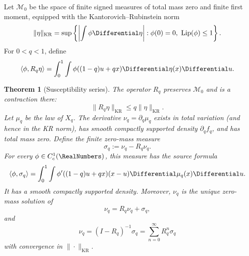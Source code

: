 \documentclass[11pt,oneside]{article}
\newtheorem{theorem}{Theorem}[section]
\theoremstyle{definition}
\theoremstyle{remark}
\newcommand{\Lip}{\operatorname{Lip}}
\begin{document}
Let \(\mathcal M_0\) be the space of finite signed measures of total mass zero and finite first
moment, equipped with the Kantorovich--Rubinstein norm
\begin{equation}
 \|\eta\|_{\mathrm{KR}}
 =\sup\left\{\left|\int\phi\Differential\eta\right|:
 \phi(0)=0,\ \Lip(\phi)\le1\right\}.
 \label{eq:KR}
\end{equation}
For \(0<q<1\), define
\begin{equation}
 \langle\phi,R_q\eta\rangle
 =\int_0^1\int\phi((1-q)u+qx)\Differential\eta(x)\Differential u.
 \label{eq:Rq}
\end{equation}

\begin{theorem}[Susceptibility series]
\label{thm:susceptibility}
The operator \(R_q\) preserves \(\mathcal M_0\) and is a contraction there:
\begin{equation}
 \|R_q\eta\|_{\mathrm{KR}}\le q\|\eta\|_{\mathrm{KR}}.
 \label{eq:Rq-contraction}
\end{equation}
Let \(\mu_q\) be the law of \(X_q\).  The derivative
\(\nu_q=\partial_q\mu_q\) exists in total variation (and hence in the KR norm), has smooth
compactly supported density \(\partial_qf_q\), and has total mass zero.  Define the finite
zero-mass measure
\begin{equation}
 \sigma_q:=\nu_q-R_q\nu_q.
 \label{eq:sigmaq-measure}
\end{equation}
For every \(\phi\in C_c^1(\RealNumbers)\), this measure has the source formula
\begin{equation}
 \langle\phi,\sigma_q\rangle
 =\int_0^1\int
 \phi'((1-q)u+qx)(x-u)\Differential\mu_q(x)\Differential u.
 \label{eq:sigmaq}
\end{equation}
It has a smooth compactly supported density.  Moreover, \(\nu_q\) is the unique zero-mass
solution of
\begin{equation}
 \nu_q=R_q\nu_q+\sigma_q,
 \label{eq:linear-response-fixed}
\end{equation}
and
\begin{equation}
 \boxed{\displaystyle
 \nu_q=(I-R_q)^{-1}\sigma_q
      =\sum_{n=0}^{\infty}R_q^n\sigma_q}
 \label{eq:susceptibility-series}
\end{equation}
with convergence in \(\|\cdot\|_{\mathrm{KR}}\).
\end{theorem}
\end{document}

